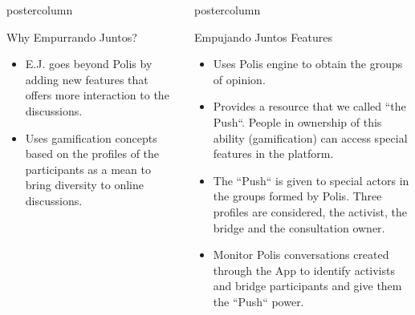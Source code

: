 \documentclass[final,hyperref={pdfpagelabels=false}]{beamer}
\newlength{\columnheight}
\begin{document}
\begin{frame}
\begin{columns}
\begin{column}{.49\textwidth}
\begin{beamercolorbox}[center,wd=\textwidth]{postercolumn}
\begin{minipage}[T]{.95\textwidth}
{\begin{block}{Why Empurrando Juntos?}
  \begin{itemize}
    \item E.J. goes beyond Polis by adding new features that offers more interaction
    to the discussions.

    \item Uses gamification concepts based on the profiles of the participants as
    a mean to bring diversity to online discussions.
  \end{itemize}
\end{block}


}
\end{minipage}
\end{beamercolorbox}
\end{column}

\begin{column}{.49\textwidth}
  \begin{beamercolorbox}[center,wd=\textwidth]{postercolumn}
    \begin{minipage}[T]{.95\textwidth} %
      \parbox[t][\columnheight]{\textwidth}{ %

\begin{block}{Empujando Juntos Features}
  \begin{itemize}
    \item Uses Polis engine to obtain the groups of opinion.

    \item Provides a resource that we called ``the Push``. People in ownership of
    this ability (gamification) can access special features in the platform.

    \item The ``Push`` is given to special actors in the groups formed by Polis.
    Three profiles are considered, the activist, the bridge and the consultation
    owner.

    \item Monitor Polis conversations created through the App
    to identify activists and bridge participants and give them the ``Push``
    power.


\end{itemize}
\end{block}}
\end{minipage}
\end{beamercolorbox}
\end{column}
\end{columns}
\end{frame}
\end{document}
